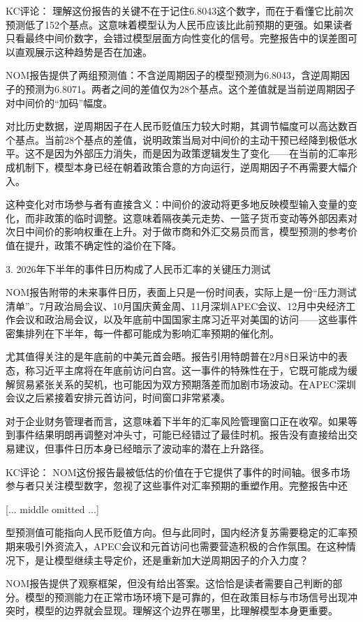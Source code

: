 \documentclass[11pt]{ctexart}
\begin{document}
KC评论： 理解这份报告的关键不在于记住6.8043这个数字，而在于看懂它比前次预测低了152个基点。这意味着模型认为人民币应该比此前预期的更强。如果读者只看最终中间价数字，会错过模型层面方向性变化的信号。完整报告中的误差图可以直观展示这种趋势是否在加速。

NOM报告提供了两组预测值：不含逆周期因子的模型预测为6.8043，含逆周期因子的预测为6.8071。两者之间的差值仅为28个基点。这个差值就是当前逆周期因子对中间价的“加码”幅度。

对比历史数据，逆周期因子在人民币贬值压力较大时期，其调节幅度可以高达数百个基点。当前28个基点的差值，说明政策当局对中间价的主动干预已经降到极低水平。这不是因为外部压力消失，而是因为政策逻辑发生了变化——在当前的汇率形成机制下，模型本身已经在朝着政策合意的方向运行，逆周期因子不再需要大幅介入。

这种变化对市场参与者有直接含义：中间价的波动将更多地反映模型输入变量的变化，而非政策的临时调整。这意味着隔夜美元走势、一篮子货币变动等外部因素对次日中间价的影响权重在上升。对于做市商和外汇交易员而言，模型预测的参考价值在提升，政策不确定性的溢价在下降。

3. 2026年下半年的事件日历构成了人民币汇率的关键压力测试

NOM报告附带的未来事件日历，表面上只是一份时间表，实际上是一份“压力测试清单”。7月政治局会议、10月国庆黄金周、11月深圳APEC会议、12月中央经济工作会议和政治局会议，以及年底前中国国家主席习近平对美国的访问——这些事件密集排列在下半年，每一件都可能成为影响汇率预期的催化剂。

尤其值得关注的是年底前的中美元首会晤。报告引用特朗普在2月8日采访中的表态，称习近平主席将在年底前访问白宫。这一事件的特殊性在于，它既可能成为缓解贸易紧张关系的契机，也可能因为双方预期落差而加剧市场波动。在APEC深圳会议之后紧接着安排元首访问，时间窗口非常紧凑。

对于企业财务管理者而言，这意味着下半年的汇率风险管理窗口正在收窄。如果等到事件结果明朗再调整对冲头寸，可能已经错过了最佳时机。报告没有直接给出交易建议，但事件日历本身已经暗示了波动率的潜在上升路径。

KC评论： NOM这份报告最被低估的价值在于它提供了事件的时间轴。很多市场参与者只关注模型数字，忽视了这些事件对汇率预期的重塑作用。完整报告中还

[... middle omitted ...]

型预测值可能指向人民币贬值方向。但与此同时，国内经济复苏需要稳定的汇率预期来吸引外资流入，APEC会议和元首访问也需要营造积极的合作氛围。在这种情况下，是让模型继续主导定价，还是重新加大逆周期因子的介入力度？

NOM报告提供了观察框架，但没有给出答案。这恰恰是读者需要自己判断的部分。模型的预测能力在正常市场环境下是可靠的，但在政策目标与市场信号出现冲突时，模型的边界就会显现。理解这个边界在哪里，比理解模型本身更重要。
\end{document}
